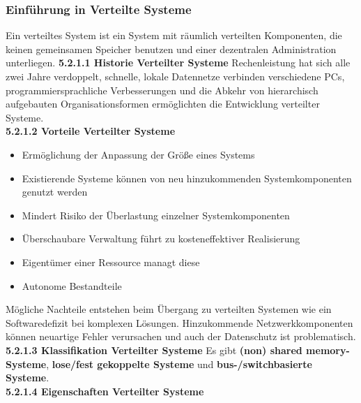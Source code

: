 \documentclass{article}
\begin{document}
\subsubsection{Einführung in Verteilte Systeme}
    Ein verteiltes System ist ein System mit räumlich verteilten Komponenten, die keinen gemeinsamen Speicher benutzen und einer dezentralen Administration unterliegen.\newline
    \textbf{5.2.1.1 Historie Verteilter Systeme}\newline
    Rechenleistung hat sich alle zwei Jahre verdoppelt, schnelle, lokale Datennetze verbinden verschiedene PCs, programmiersprachliche Verbesserungen und die Abkehr von hierarchisch aufgebauten Organisationsformen ermöglichten die Entwicklung verteilter Systeme.\newline
    \\
    \textbf{5.2.1.2 Vorteile Verteilter Systeme}\newline
    \begin{itemize}
        \item Ermöglichung der Anpassung der Größe eines Systems
        \item Existierende Systeme können von neu hinzukommenden Systemkomponenten genutzt werden
        \item Mindert Risiko der Überlastung einzelner Systemkomponenten
        \item Überschaubare Verwaltung führt zu kosteneffektiver Realisierung
        \item Eigentümer einer Ressource managt diese
        \item Autonome Bestandteile
    \end{itemize}
    Mögliche Nachteile entstehen beim Übergang zu verteilten Systemen wie ein Softwaredefizit bei komplexen Lösungen. Hinzukommende Netzwerkkomponenten können neuartige Fehler verursachen und auch der Datenschutz ist problematisch.\newline
    \\
    \textbf{5.2.1.3 Klassifikation Verteilter Systeme}\newline
    Es gibt \textbf{(non) shared memory-Systeme}, \textbf{lose/fest gekoppelte Systeme} und \textbf{bus-/switchbasierte Systeme}.\newline
    \\
    \textbf{5.2.1.4 Eigenschaften Verteilter Systeme}\newline
\end{document}
